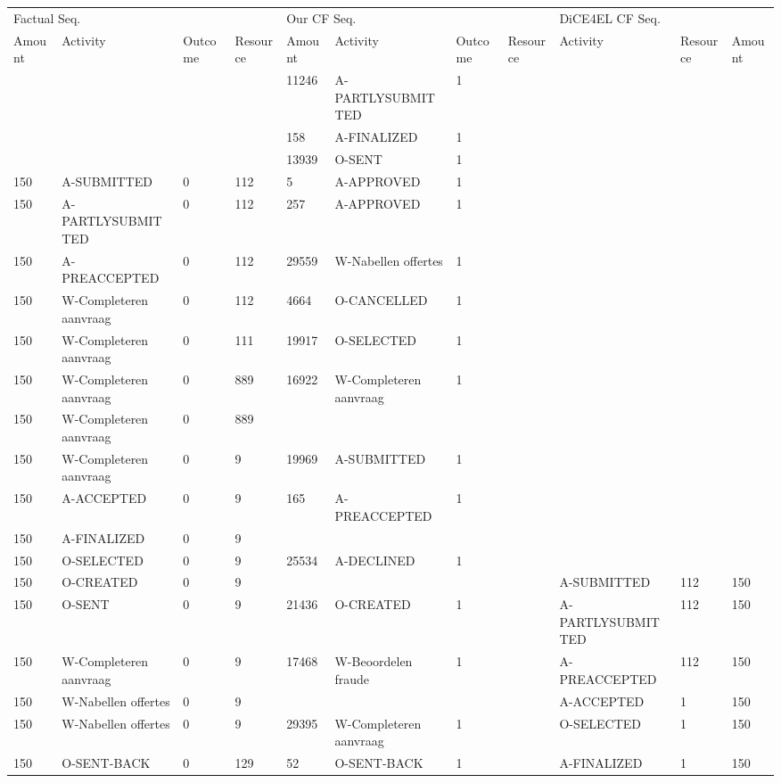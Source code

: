 \begin{tabular}{lllllllllll}
\toprule
\multicolumn{4}{l}{Factual Seq.} & \multicolumn{4}{l}{Our CF Seq.} & \multicolumn{3}{l}{DiCE4EL CF Seq.} \\
Amount & Activity & Outcome & Resource & Amount & Activity & Outcome & Resource & Activity & Resource & Amount \\
\midrule
 &  &  &  & 11246 & A-PARTLYSUBMITTED & 1 &  &  &  &  \\
 &  &  &  & 158 & A-FINALIZED & 1 &  &  &  &  \\
 &  &  &  & 13939 & O-SENT & 1 &  &  &  &  \\
150 & A-SUBMITTED & 0 & 112 & 5 & A-APPROVED & 1 &  &  &  &  \\
150 & A-PARTLYSUBMITTED & 0 & 112 & 257 & A-APPROVED & 1 &  &  &  &  \\
150 & A-PREACCEPTED & 0 & 112 & 29559 & W-Nabellen offertes & 1 &  &  &  &  \\
150 & W-Completeren aanvraag & 0 & 112 & 4664 & O-CANCELLED & 1 &  &  &  &  \\
150 & W-Completeren aanvraag & 0 & 111 & 19917 & O-SELECTED & 1 &  &  &  &  \\
150 & W-Completeren aanvraag & 0 & 889 & 16922 & W-Completeren aanvraag & 1 &  &  &  &  \\
150 & W-Completeren aanvraag & 0 & 889 &  &  &  &  &  &  &  \\
150 & W-Completeren aanvraag & 0 & 9 & 19969 & A-SUBMITTED & 1 &  &  &  &  \\
150 & A-ACCEPTED & 0 & 9 & 165 & A-PREACCEPTED & 1 &  &  &  &  \\
150 & A-FINALIZED & 0 & 9 &  &  &  &  &  &  &  \\
150 & O-SELECTED & 0 & 9 & 25534 & A-DECLINED & 1 &  &  &  &  \\
150 & O-CREATED & 0 & 9 &  &  &  &  & A-SUBMITTED & 112 & 150 \\
150 & O-SENT & 0 & 9 & 21436 & O-CREATED & 1 &  & A-PARTLYSUBMITTED & 112 & 150 \\
150 & W-Completeren aanvraag & 0 & 9 & 17468 & W-Beoordelen fraude & 1 &  & A-PREACCEPTED & 112 & 150 \\
150 & W-Nabellen offertes & 0 & 9 &  &  &  &  & A-ACCEPTED & 1 & 150 \\
150 & W-Nabellen offertes & 0 & 9 & 29395 & W-Completeren aanvraag & 1 &  & O-SELECTED & 1 & 150 \\
150 & O-SENT-BACK & 0 & 129 & 52 & O-SENT-BACK & 1 &  & A-FINALIZED & 1 & 150 \\

\end{tabular}
